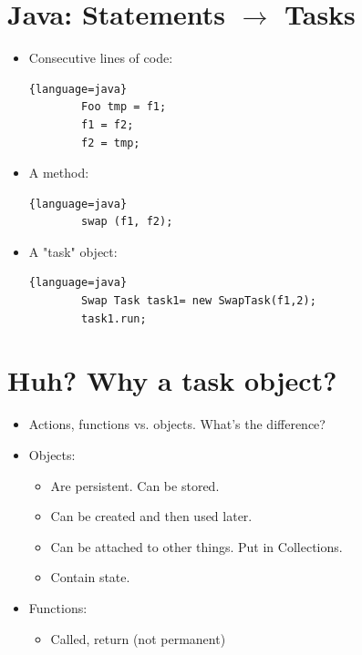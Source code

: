 \documentclass[12pt, a4paper]{book}
\begin{document}
\section{Java: Statements $\rightarrow$ Tasks}
\begin{itemize}
    \item  Consecutive lines of code:
          \begin{lstlisting}{language=java}
        Foo tmp = f1;
        f1 = f2;
        f2 = tmp;
    \end{lstlisting}
    \item A method:
          \begin{lstlisting}{language=java}
        swap (f1, f2);
    \end{lstlisting}
    \item A "task" object:
          \begin{lstlisting}{language=java}
        Swap Task task1= new SwapTask(f1,2);
        task1.run;
    \end{lstlisting}
\end{itemize}

\section{Huh? Why a task object?}
\begin{itemize}
    \item  Actions, functions vs. objects. What's the difference?
    \item Objects:
          \begin{itemize}
              \item Are persistent. Can be stored.
              \item Can be created and then used later.
              \item Can be attached to other things. Put in Collections.
              \item Contain state.
          \end{itemize}
    \item Functions:
          \begin{itemize}
              \item Called, return (not permanent)
          \end{itemize}
\end{itemize}
\end{document}
